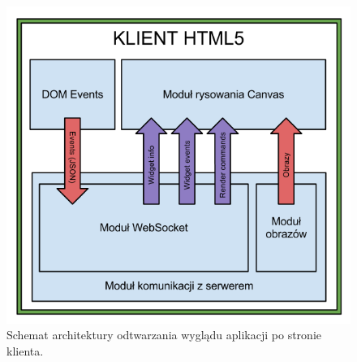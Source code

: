 
\begin{figure}[H]
\centering
\includegraphics[width=0.8\linewidth]{img/arch-render}
\caption{Schemat architektury odtwarzania wyglądu aplikacji po stronie klienta.}
\label{fig:arch-render}
\end{figure}
